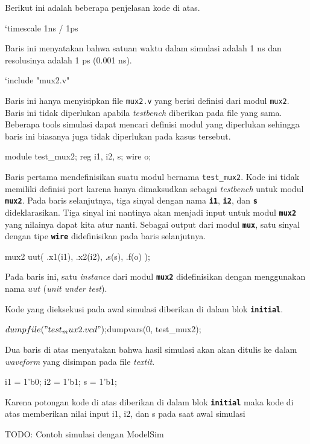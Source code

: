 Berikut ini adalah beberapa penjelasan kode di atas.

\begin{verilogcode}
`timescale 1ns / 1ps
\end{verilogcode}
Baris ini menyatakan bahwa satuan waktu dalam simulasi adalah 1 ns dan
resolusinya adalah 1 ps (0.001 ns).

\begin{verilogcode}
`include "mux2.v"
\end{verilogcode}
Baris ini hanya menyisipkan file {\tt mux2.v} yang berisi definisi dari modul {\tt mux2}.
Baris ini tidak diperlukan apabila \textit{testbench} diberikan pada file yang sama.
Beberapa tools simulasi dapat mencari definisi modul yang diperlukan sehingga
baris ini biasanya juga tidak diperlukan pada kasus tersebut.

\begin{verilogcode}
module test_mux2;
  reg i1, i2, s;
  wire o;
\end{verilogcode}

Baris pertama mendefinisikan suatu modul bernama {\tt\small test\_mux2}. Kode
ini tidak memiliki definisi port karena hanya dimaksudkan sebagai {\it testbench}
untuk modul {\tt\textbf{mux2}}. Pada baris selanjutnya,
tiga sinyal dengan nama {\tt\textbf{i1}}, {\tt\textbf{i2}},
dan {\tt\textbf{s}} dideklarasikan. Tiga sinyal ini nantinya akan menjadi input untuk
modul {\tt\textbf{mux2}}
yang nilainya dapat kita atur nanti.
Sebagai output dari modul {\tt\textbf{mux}}, satu sinyal dengan tipe {\tt\textbf{wire}}
didefinisikan pada baris selanjutnya.

\begin{verilogcode}
  mux2 uut( .x1(i1), .x2(i2), .s(s), .f(o) );
\end{verilogcode}

Pada baris ini, satu \textit{instance} dari modul {\tt\textbf{mux2}} didefinisikan
dengan menggunakan nama $uut$ (\textit{unit under test}).

Kode yang dieksekusi pada awal simulasi diberikan di dalam blok
{\tt\textbf{initial}}.

\begin{verilogcode}
  $dumpfile("test_mux2.vcd");
  $dumpvars(0, test_mux2);
\end{verilogcode}

Dua baris di atas menyatakan bahwa hasil simulasi akan akan ditulis
ke dalam \textit{waveform} yang disimpan pada file \textit{textit}.

\begin{verilogcode}
i1 = 1'b0;
i2 = 1'b1;
s  = 1'b1;
\end{verilogcode}

Karena potongan kode di atas diberikan di dalam blok {\tt\textbf{initial}}
maka kode di atas memberikan nilai input i1, i2, dan s pada saat awal
simulasi

{\color{red} TODO: Contoh simulasi dengan ModelSim}
